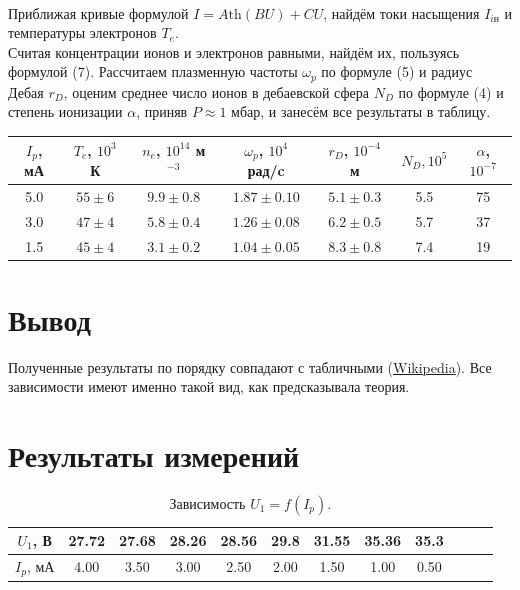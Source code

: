 \documentclass[a4paper,12pt]{article}
\begin{document}
$ $\\

Приближая кривые формулой $I = A \text{th}(BU) + CU$, найдём токи насыщения $I_{i\text{н}}$ и температуры электронов $T_e$.\\
Считая концентрации ионов и электронов равными, найдём их, пользуясь формулой (7). Рассчитаем плазменную частоты $\omega_p$ по формуле (5) и радиус Дебая $r_D$, оценим среднее число ионов в дебаевской сфера $N_D$ по формуле (4) и  степень ионизации $\alpha$, приняв $P\approx 1$ мбар, и занесём все результаты в таблицу.
\begin{table}[h!]
\centering
\begin{tabular}{|c|c|c|c|c|c|c|}
\hline
$I_p$, мА  & $T_e$, $10^3$ К   & $n_e$, $10^{14}$ м$^{-3}$ & $\omega_p$, $10^4$ рад/c & $r_D$, $10^{-4}$ м & $N_D, 10^5$ & $\alpha$, $10^{-7}$ \\ \hline
5.0   & $55\pm 6$ & $9.9\pm 0.8$                     & $1.87\pm 0.10$                   & $5.1\pm 0.3$                      & 5.5 & 75\\ \hline
3.0   & $47\pm 4$ & $5.8\pm 0.4$                     & $1.26\pm 0.08$                    & $6.2\pm 0.5$                      & 5.7 & 37\\ \hline
1.5   & $45\pm 4$ & $3.1\pm 0.2$                    & $1.04\pm 0.05$                     & $8.3 \pm 0.8$                     & 7.4 & 19\\ \hline
\end{tabular}
\end{table}

\section*{Вывод}

Полученные результаты по порядку совпадают с табличными (\href{https://en.wikipedia.org/wiki/Debye_length}{Wikipedia}). Все зависимости имеют именно такой вид, как предсказывала теория.
\newpage
\section*{Результаты измерений}
\begin{table}[h]
\centering
\begin{tabular}{|c|c|c|c|c|c|c|c|c|c|c|c|}
\hline
$U_1$, В & 27.72 & 27.68 & 28.26 & 28.56 & 29.8 & 31.55 & 35.36 & 35.3 \\ \hline
$I_p$, мА & 4.00 & 3.50  & 3.00  & 2.50 & 2.00  & 1.50  & 1.00  & 0.50 \\ \hline
\end{tabular}
\caption{Зависимость $U_1 = f(I_p)$.}
\end{table}
\end{document}
